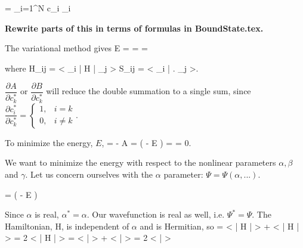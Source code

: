 \documentclass[Dissertation.tex]{subfiles}
\begin{document}
\beq
\Psi = \sum_{i=1}^N c_i \psi_i
\eeq

\textbf{Rewrite parts of this in terms of formulas in BoundState.tex.}

The variational method gives
\beq
E = 
  = 
  =  \equiv {}
\eeq

where
\beq
H_{ij} = \left< \psi_i \left| H \right| \psi_j \right>
S_{ij} = \left< \psi_i \left| \right.\! \psi_j \right>.
\eeq

$\dfrac{\partial A}{\partial c_k^*}$ or $\dfrac{\partial B}{\partial c_k^*}$ will reduce the double summation to a single sum, since 
$ \dfrac{\partial c_i^*}{\partial c_k^*} =
\begin{cases}
1,& i = k \\
0,& i \neq k
\end{cases}.$

To minimize the energy, $E$,
\beq
{} =   -   A
=  \left( - E \right)
=  = 0.
\eeq

We want to minimize the energy with respect to the nonlinear parameters $\alpha, \beta$ and $\gamma$.  Let us concern ourselves with the $\alpha$ parameter:  $\Psi = \Psi(\alpha, ...)$.

\beq
{} =  \left( - E  \right)
\label{eq:EnergyDerE1}
\eeq

Since $\alpha$ is real, $\alpha^* = \alpha$.  Our wavefunction is real as well, i.e. $\Psi^* = \Psi$.  The Hamiltonian, H, is independent of $\alpha$ and is Hermitian, so
\beq
{} = \left< \Psi \Big| H \Big| \frac{\partial\Psi}{\partial \alpha} \right> + 
    \left< \frac{\partial\Psi}{\partial \alpha} \Big| H \Big| \Psi \right> = 2 \left< \Psi \Big| H \Big| \frac{\partial\Psi}{\partial \alpha} \right>
\label{eq:EnergyDerPartA}
\eeq
\beq
{} = \left< \Psi \Big| \frac{\partial\Psi}{\partial \alpha} \right> + 
    \left< \frac{\partial\Psi}{\partial \alpha} \Big| \Psi \right> = 2 \left< \Psi \Big| \frac{\partial\Psi}{\partial \alpha} \right>
\label{eq:EnergyDerPartB}
\eeq
\end{document}
